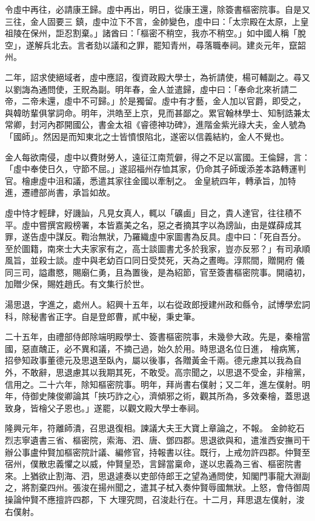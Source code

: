 \begin{pinyinscope}
 令虛中再往，必請康王歸。虛中再出，明日，從康王還，除簽書樞密院事。自是又三往，金人固要三
 鎮，虛中泣下不言，金帥變色，虛中曰：「太宗殿在太原，上皇祖陵在保州，詎忍割棄。」諸酋曰：「樞密不稍空，我亦不稍空。」如中國人稱「脫空」，遂解兵北去。言者劾以議和之罪，罷知青州，尋落職奉祠。建炎元年，竄韶州。



 二年，詔求使絕域者，虛中應詔，復資政殿大學士，為祈請使，楊可輔副之。尋又以劉誨為通問使，王貺為副。明年春，金人並遣歸，虛中曰：「奉命北來祈請二帝，二帝未還，虛中不可歸。」於是獨留。虛中有才藝，金人加以官爵，即受之，
 與韓昉輩俱掌詞命。明年，洪皓至上京，見而甚鄙之。累官翰林學士、知制誥兼太常卿，封河內郡開國公，書金太祖《睿德神功碑》，進階金紫光祿大夫，金人號為「國師」。然因是而知東北之士皆憤恨陷北，遂密以信義結約，金人不覺也。



 金人每欲南侵，虛中以費財勞人，遠征江南荒僻，得之不足以富國。王倫歸，言：「虛中奉使日久，守節不屈。」遂詔福州存恤其家，仍命其子師瑗添差本路轉運判官。檜慮虛中沮和議，悉遣其家往金國以牽制之。
 金皇統四年，轉承旨，加特進，遷禮部尚書，承旨如故。



 虛中恃才輕肆，好譏訕，凡見女真人，輒以「礦鹵」目之，貴人達官，往往積不平。虛中嘗撰宮殿榜署，本皆嘉美之名，惡之者摘其字以為謗訕，由是媒薛成其罪，遂告虛中謀反。鞫治無狀，乃羅織虛中家圖書為反具。虛中曰：「死自吾分。至於圖籍，南來士大夫家家有之，高士談圖書尤多於我家，豈亦反邪？」有司承順風旨，並殺士談。虛中與老幼百口同日受焚死，天為之晝晦。淳熙間，贈開府
 儀同三司，謚肅愍，賜廟仁勇，且為置後，是為紹節，官至簽書樞密院事。開禧初，加贈少保，賜姓趙氏。有文集行於世。



 湯思退，字進之，處州人。紹興十五年，以右從政郎授建州政和縣令，試博學宏詞科，除秘書省正字。自是登郎曹，貳中秘，秉史筆。



 二十五年，由禮部侍郎除端明殿學士、簽書樞密院事，未幾參大政。先是，秦檜當國，惡直醜正，必不異和議，不摘己過，始久於用。時思退名位日進，
 檜病篤，招參知政事董德元及思退至臥內，屬以後事，各贈黃金千兩。德元慮其以我為自外，不敢辭，思退慮其以我期其死，不敢受。高宗聞之，以思退不受金，非檜黨，信用之。二十六年，除知樞密院事。明年，拜尚書右僕射；又二年，進左僕射。明年，侍御史陳俊卿論其「挾巧詐之心，濟傾邪之術，觀其所為，多效秦檜，蓋思退致身，皆檜父子恩也。」遂罷，以觀文殿大學士奉祠。



 隆興元年，符離師潰，召思退復相。諫議大夫王大寶上章論之，不報。
 金帥紇石烈志寧遺書三省、樞密院，索海、泗、唐、鄧四郡。思退欲與和，遣淮西安撫司干辦公事盧仲賢加樞密院計議、編修官，持報書以往。既行，上戒勿許四郡。仲賢至宿州，僕散忠義懼之以威，仲賢皇恐，言歸當稟命，遂以忠義為三省、樞密院書來。上猶欲止割海、泗，思退遽奏以吏部侍郎王之望為通問使，知閣門事龍大淵副之，將割棄四州。張浚在揚州聞之，遣其子栻入奏仲賢辱國無狀。上怒，會侍御周操論仲賢不應擅許四郡，下
 大理究問，召浚赴行在。十二月，拜思退左僕射，浚右僕射。




\end{pinyinscope}
